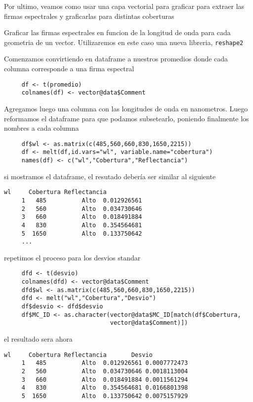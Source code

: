 Por ultimo, veamos como usar una capa vectorial para graficar para extraer las
firmas espectrales y graficarlas para distintas coberturas

\begin{exa}
     Graficar las firmas espectrales en funcion de la longitud de onda para cada
     geometria de un vector. Utilizaremos en este caso una nueva libreria,
     \texttt{reshape2}

     Comenzamos convirtiendo en dataframe a nuestros promedios donde cada
     columna corresponde a una firma espectral
     \begin{lstlisting}
     df <- t(promedio)
     colnames(df) <- vector@data$Comment
     \end{lstlisting}
     Agregamos luego una columna con las longitudes de onda en nanometros. Luego
     reformamos el dataframe para que podamos subsetearlo, poniendo finalmente
     los nombres a cada columna
     \begin{lstlisting}
     df$wl <- as.matrix(c(485,560,660,830,1650,2215))
     df <- melt(df,id.vars="wl", variable.name="cobertura")
     names(df) <- c("wl","Cobertura","Reflectancia")
     \end{lstlisting}
     si mostramos el dataframe, el resutado debería ser similar al siguiente
     \begin{Verbatim}[fontsize=\small]
          wl     Cobertura Reflectancia
     1   485          Alto  0.012926561
     2   560          Alto  0.034730646
     3   660          Alto  0.018491884
     4   830          Alto  0.354564681
     5  1650          Alto  0.133750642
     ...
     \end{Verbatim}
     repetimos el proceso para los desvios standar
     \begin{lstlisting}
     dfd <- t(desvio)
     colnames(dfd) <- vector@data$Comment
     dfd$wl <- as.matrix(c(485,560,660,830,1650,2215))
     dfd <- melt("wl","Cobertura","Desvio")
     df$desvio <- dfd$desvio
     df$MC_ID <- as.character(vector@data$MC_ID[match(df$Cobertura,
                              vector@data$Comment)])
     \end{lstlisting}
     el resultado sera ahora
     \begin{Verbatim}[fontsize=\small]
         wl     Cobertura Reflectancia       Desvio
     1   485          Alto  0.012926561 0.0007772473
     2   560          Alto  0.034730646 0.0018113004
     3   660          Alto  0.018491884 0.0011561294
     4   830          Alto  0.354564681 0.0166801398
     5  1650          Alto  0.133750642 0.0075157929

\end{Verbatim}
\end{exa}
